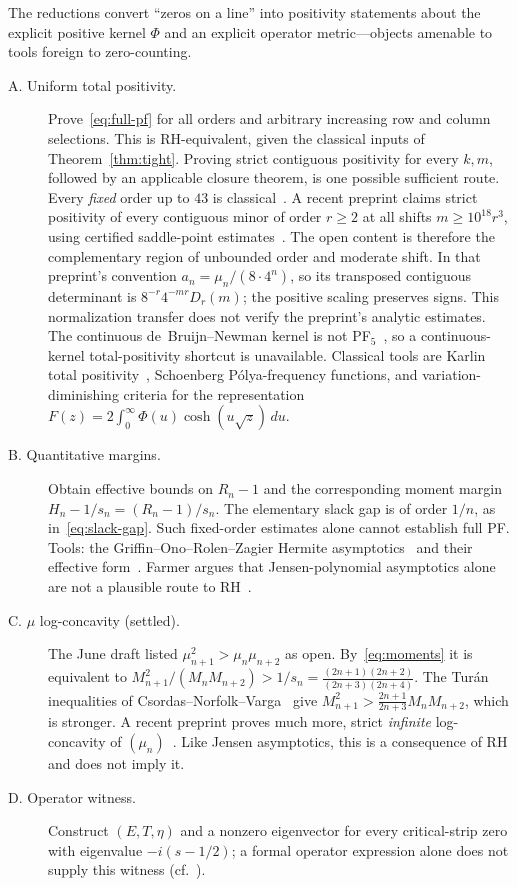 \documentclass[11pt]{article}
\theoremstyle{plain}
\theoremstyle{definition}
\theoremstyle{remark}
\begin{document}
The reductions convert ``zeros on a line'' into positivity statements about the
explicit positive kernel $\Phi$ and an explicit operator metric---objects amenable
to tools foreign to zero-counting.
\begin{description}
  \item[A. Uniform total positivity.] Prove~\eqref{eq:full-pf} for all orders
  and arbitrary increasing row and column selections. This is RH-equivalent,
  given the classical inputs of Theorem~\ref{thm:tight}. Proving strict
  contiguous positivity for every $k,m$, followed by an applicable closure
  theorem, is one possible sufficient route. Every \emph{fixed} order up to
  $43$ is classical~\cite{Katkova2007}. A recent preprint claims strict positivity
  of every contiguous minor of order $r\ge2$ at all shifts $m\ge10^{18}r^3$, using
  certified saddle-point estimates~\cite{Michalowski2026wedge}. The open content is
  therefore the complementary region of unbounded order and moderate shift.
  In that preprint's convention $a_n=\mu_n/(8\cdot4^n)$, so its transposed
  contiguous determinant is $8^{-r}4^{-mr}D_r(m)$; the positive scaling
  preserves signs. This normalization transfer does not verify the preprint's
  analytic estimates. The continuous
  de~Bruijn--Newman kernel is not PF$_5$~\cite{Michalowski2026pf5}, so a
  continuous-kernel total-positivity shortcut is unavailable. Classical tools are
  Karlin total positivity~\cite{Karlin1968}, Schoenberg Pólya-frequency functions, and
  variation-diminishing criteria for the representation
  $F(z)=2\int_0^\infty\Phi(u)\cosh(u\sqrt z)\,du$.
  \item[B. Quantitative margins.] Obtain effective bounds on $R_n-1$ and
  the corresponding moment margin $H_n-1/s_n=(R_n-1)/s_n$.
  The elementary slack gap is of order $1/n$, as in~\eqref{eq:slack-gap}.
  Such fixed-order estimates alone cannot establish full PF.
  Tools: the Griffin--Ono--Rolen--Zagier Hermite asymptotics~\cite{GORZ2019} and
  their effective form~\cite{GORTTW}. Farmer argues that Jensen-polynomial
  asymptotics alone are not a plausible route to RH~\cite{Farmer2022}.
  \item[C. $\mu$ log-concavity (settled).] The June draft listed
  $\mu_{n+1}^2>\mu_n\mu_{n+2}$ as open. By~\eqref{eq:moments} it is equivalent to
  $M_{n+1}^2/(M_nM_{n+2})>1/s_n=\frac{(2n+1)(2n+2)}{(2n+3)(2n+4)}$. The Turán
  inequalities of Csordas--Norfolk--Varga~\cite{CNV1986} give
  $M_{n+1}^2>\frac{2n+1}{2n+3}M_nM_{n+2}$, which is stronger. A recent preprint proves much more,
  strict \emph{infinite} log-concavity of $(\mu_n)$~\cite{LiuMao2026}. Like
  Jensen asymptotics, this is a consequence of RH and does not imply it.
  \item[D. Operator witness.] Construct $(E,T,\eta)$ and a nonzero
  eigenvector for every critical-strip zero with eigenvalue $-i(s-1/2)$;
  a formal operator expression alone does not supply this witness
  (cf.~\cite{BBM2017}).
\end{description}
\end{document}
